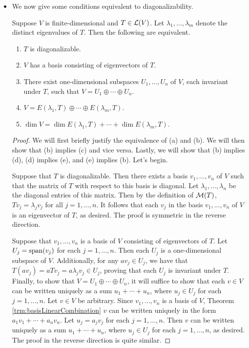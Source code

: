 \documentclass[../main.tex]{subfiles}
\begin{document}
\begin{itemize}
    \item We now give some conditions equivalent to diagonalizability.
    \begin{theorem}\label{trm:diagonalizableConditions}
        Suppose $V$ is finite-dimensional and $T\in\mathcal{L}(V)$. Let $\lambda_1,\dots,\lambda_m$ denote the distinct eigenvalues of $T$. Then the following are equivalent.
        \begin{enumerate}[label={\textup{(}\alph*\textup{)}}]
            \item $T$ is diagonalizable.
            \item $V$ has a basis consisting of eigenvectors of $T$.
            \item There exist one-dimensional subspaces $U_1,\dots,U_n$ of $V$, each invariant under $T$, such that $V=U_1\oplus\cdots\oplus U_n$.
            \item $V=E(\lambda_1,T)\oplus\cdots\oplus E(\lambda_m,T)$.
            \item $\dim V=\dim E(\lambda_1,T)+\cdots+\dim E(\lambda_m,T)$.
        \end{enumerate}
        \begin{proof}
            We will first briefly justify the equivalence of (a) and (b). We will then show that (b) implies (c) and vice versa. Lastly, we will show that (b) implies (d), (d) implies (e), and (e) implies (b). Let's begin.\par\smallskip
            Suppose that $T$ is diagonalizable. Then there exists a basis $v_1,\dots,v_n$ of $V$ such that the matrix of $T$ with respect to this basis is diagonal. Let $\lambda_1,\dots,\lambda_n$ be the diagonal entries of this matrix. Then by the definition of $\mathcal{M}(T)$, $Tv_j=\lambda_jv_j$ for all $j=1,\dots,n$. It follows that each $v_j$ in the basis $v_1,\dots,v_n$ of $V$ is an eigenvector of $T$, as desired. The proof is symmetric in the reverse direction.\par\smallskip
            Suppose that $v_1,\dots,v_n$ is a basis of $V$ consisting of eigenvectors of $T$. Let $U_j=\operatorname{span}(v_j)$ for each $j=1,\dots,n$. Then each $U_j$ is a one-dimensional subspace of $V$. Additionally, for any $av_j\in U_j$, we have that $T(av_j)=aTv_j=a\lambda_jv_j\in U_j$, proving that each $U_j$ is invariant under $T$. Finally, to show that $V=U_1\oplus\cdots\oplus U_n$, it will suffice to show that each $v\in V$ can be written uniquely as a sum $u_1+\cdots+u_n$, where $u_j\in U_j$ for each $j=1,\dots,n$. Let $v\in V$ be arbitrary. Since $v_1,\dots,v_n$ is a basis of $V$, Theorem \ref{trm:basisLinearCombination} $v$ can be written uniquely in the form $a_1v_1+\cdots+a_nv_n$. Let $u_j=a_jv_j$ for each $j=1,\dots,n$. Then $v$ can be written uniquely as a sum $u_1+\cdots+u_n$, where $u_j\in U_j$ for each $j=1,\dots,n$, as desired. The proof in the reverse direction is quite similar.\par\smallskip

\end{proof}
\end{theorem}
\end{itemize}
\end{document}
